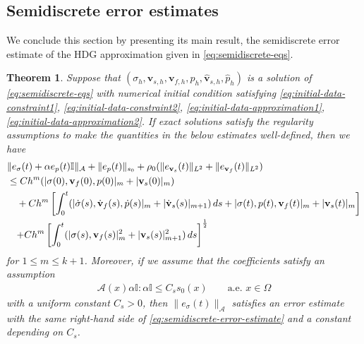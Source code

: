 \documentclass[10pt,letterpaper]{amsart}
\theoremstyle{plain} %
\newtheorem{theorem}{Theorem}[section] %
\theoremstyle{remark} %
\newcommand{\vect}[1]{\mathbf{#1}}
\newcommand{\Id}{\mathbb{I}} %
\newcommand{\Ael}{\mathcal{A}} %
\begin{document}
\subsection{Semidiscrete error estimates} \label{subsec:energy-estimates} 
We conclude this section by presenting its main result, the semidiscrete error estimate of the HDG approximation given in \eqref{eq:semidiscrete-eqs}.
\begin{theorem}\label{thm:semidiscrete-error-estimate}
	Suppose that $(\sigma_{h}, \vect{v}_{s,h}, \vect{v}_{f,h}, p_{h}, \widehat{\vect{v}}_{s,h}, \widehat{p}_{h})$ is a solution of \eqref{eq:semidiscrete-eqs} with numerical initial condition satisfying \eqref{eq:initial-data-constraint1}, \eqref{eq:initial-data-constraint2}, \eqref{eq:initial-data-approximation1}, \eqref{eq:initial-data-approximation2}. If exact solutions satisfy the regularity assumptions to make the quantities in the below estimates well-defined, then we have 
	\begin{align}
		\label{eq:semidiscrete-error-estimate}
		&\| e_{\sigma} (t) + \alpha e_{p}(t)\Id \|_{\Ael} + \|e_{p}(t)\|_{s_0} + \rho_0 (\|e_{\vect{v}_{s}}(t)\|_{L^2} + \|e_{\vect{v}_{f}}(t)\|_{L^2} )
		\\
		\notag
		&\leq C h^m (| \sigma(0), \vect{v}_{f}(0), p(0)|_{m} + |\vect{v}_{s}(0)|_{m})
		\\ 
		\notag
		&\quad + C h^m \left[ \int_0^t (| \dot{\sigma}(s), {\dot{\vect{v}}_{f}}(s), \dot{p}(s)|_{m} + |\dot{\vect{v}}_{s}(s) |_{m+1}) \,ds +  | \sigma (t), p(t), \vect{v}_{f}(t)|_{m} + |\vect{v}_{s}(t)|_{m} \right]
		\\ 
		\notag
		&\quad {
			+ C h^m \left[ \int_0^t (| {\sigma}(s), {\vect{v}}_{f}(s)|_{m}^2 + |{\vect{v}}_{s}(s) |_{m+1}^2) \,ds \right]^{\frac 12} }        
	\end{align}
	for $1\le m \le k+1$. 
	Moreover, if we assume that the coefficients satisfy an assumption 
	\begin{align}
		\Ael (x) \alpha \Id : \alpha \Id \le C_s s_0 (x) \qquad \text{a.e. } x \in \Omega    
	\end{align}
	with a uniform constant $C_s>0$, then $\| e_{\sigma} (t) \|_{\Ael}$ satisfies an error estimate with the same right-hand side of \eqref{eq:semidiscrete-error-estimate} and a constant depending on $C_s$. 
\end{theorem}
%
\end{document}
